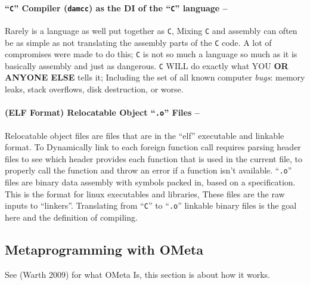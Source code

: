 \hypertarget{c-compiler-damcc-as-the-di-of-the-c-language}{%
\paragraph{\texorpdfstring{``\texttt{C}'' Compiler (\texttt{damcc}) as
the DI of the ``\texttt{C}'' language
--}{``C'' Compiler (damcc) as the DI of the ``C'' language --}}\label{c-compiler-damcc-as-the-di-of-the-c-language}}

Rarely is a language as well put together as \texttt{C}, Mixing
\texttt{C} and assembly can often be as simple as not translating the
assembly parts of the \texttt{C} code. A lot of compromises were made to
do this; \texttt{C} is not so much a language so much as it is basically
assembly and just as dangerous. \texttt{C} WILL do exactly what YOU
\textbf{OR ANYONE ELSE} tells it; Including the set of all known
computer \emph{bugs}: memory leaks, stack overflows, disk destruction,
or worse.

\hypertarget{elf-format-relocatable-object-.o-files}{%
\paragraph{\texorpdfstring{(ELF Format) Relocatable Object
``\texttt{.o}'' Files
--}{(ELF Format) Relocatable Object ``.o'' Files --}}\label{elf-format-relocatable-object-.o-files}}

Relocatable object files are files that are in the ``elf'' executable
and linkable format. To Dynamically link to each foreign function call
requires parsing header files to see which header provides each function
that is used in the current file, to properly call the function and
throw an error if a function isn't available. ``\texttt{.o}'' files are
binary data assembly with symbols packed in, based on a specification.
This is the format for linux executables and libraries, These files are
the raw inputs to ``linkers''. Translating from ``\texttt{C}'' to
``\texttt{.o}'' linkable binary files is the goal here and the
definition of compiling.

\hypertarget{metaprogramming-with-ometa}{%
\subsection{\texorpdfstring{Metaprogramming with
\textbf{OMeta}}{Metaprogramming with OMeta}}\label{metaprogramming-with-ometa}}

See (Warth 2009) for what OMeta Is, this section is about how it works.

